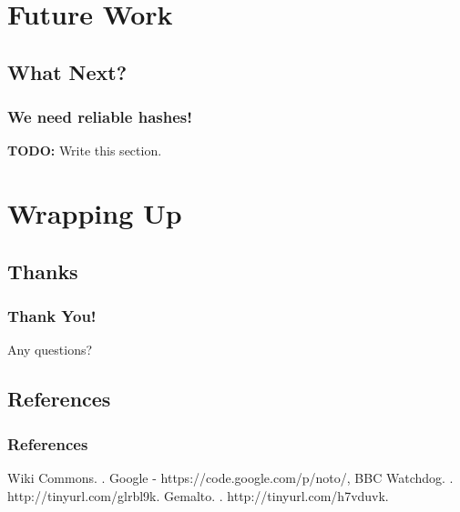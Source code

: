 \documentclass{beamer}
\begin{document}
  \section{Future Work}
    \subsection{What Next?}
      \begin{frame}
        \frametitle{We need reliable hashes!}
        \textbf{TODO:} Write this section.
      \end{frame}
  \section{Wrapping Up}
    \subsection{Thanks}
      \begin{frame}
        \frametitle{Thank You!}
        Any questions?
      \end{frame}
    \subsection{References}
      \begin{frame}[allowframebreaks]
        \frametitle{References}
        \begin{thebibliography}{3}
          \beamertemplateonlinebibitems
              Wiki Commons.
              .
              \newblock [Accessed 04-2016] Google - https://code.google.com/p/noto/,
          \beamertemplateonlinebibitems
              BBC Watchdog.
              .
              \newblock [Accessed 04-2016] http://tinyurl.com/glrbl9k.
          \beamertemplateonlinebibitems
              Gemalto.
              .
              \newblock [Accessed 04-2016] http://tinyurl.com/h7vduvk.
        \end{thebibliography}
      \end{frame}
\end{document}
